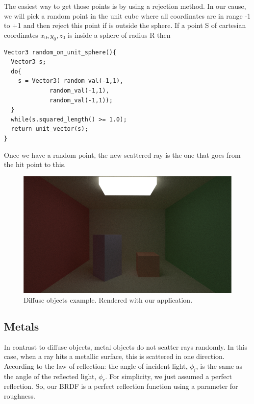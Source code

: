 \documentclass[titlepage,12pt]{report}
\begin{document}
The easiest way to get those points is by using a rejection method. In our cause, we will pick a random point in the unit cube where all coordinates are in range -1 to +1 and then reject this point if is outside the sphere. If a point S of cartesian coordinates $x_0, y_0, z_0$ is inside a sphere of radius R then 

\begin{lstlisting}
Vector3 random_on_unit_sphere(){
  Vector3 s;
  do{
    s = Vector3( random_val(-1,1), 
    		 random_val(-1,1), 
    		 random_val(-1,1));
  }
  while(s.squared_length() >= 1.0);
  return unit_vector(s);
}
\end{lstlisting}

Once we have a random point, the new scattered ray is the one that goes from the hit point to this.

\begin{figure}[H]
	\centering
	\includegraphics[scale=0.65]{media/cornell_normal_test.png}
	\caption{Diffuse objects example. Rendered with our application.}
	\label{diff3}
\end{figure}

\subsection{Metals}

In contrast to diffuse objects, metal objects do not scatter rays randomly. In this case, when a ray hits a metallic surface, this is scattered in one direction. According to the law of reflection: the angle of incident light, $\phi_i$, is the same as the angle of the reflected light, $\phi_r$. For simplicity, we just assumed a perfect reflection. So, our BRDF is a perfect reflection function using a parameter for roughness.
\end{document}
